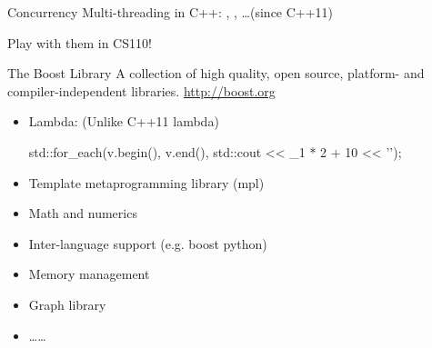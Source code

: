 \begin{frame}{Concurrency}
    Multi-threading in C++: , , \dots (since C++11)

    Play with them in CS110!
\end{frame}

\begin{frame}[fragile]{The Boost Library}
    A collection of high quality, open source, platform- and compiler-independent libraries. \url{http://boost.org}
    \begin{itemize}
        \item Lambda: (Unlike C++11 lambda)
        \begin{cpp}
std::for_each(v.begin(), v.end(),
            std::cout << _1 * 2 + 10 << '\n');
        \end{cpp}
        \item Template metaprogramming library (mpl)
        \item Math and numerics
        \item Inter-language support (e.g. boost python)
        \item Memory management
        \item Graph library
        \item \dots\dots
    \end{itemize}
\end{frame}